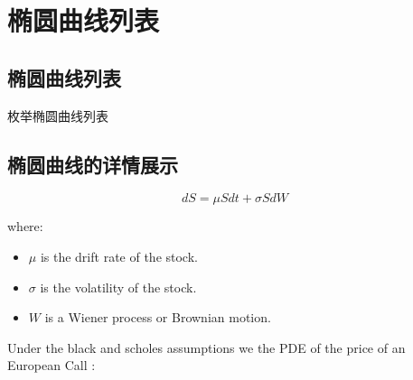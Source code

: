 \documentclass[../Main.tex]{subfiles}
\begin{document}
\chapter{椭圆曲线列表}


\section{椭圆曲线列表}
枚举椭圆曲线列表
\begin{enumerate}

\end{enumerate}

\section{椭圆曲线的详情展示}

\begin{enumerate}

\end{enumerate}

\begin{equation}
    dS = \mu S dt + \sigma S dW
\end{equation}

where:
\begin{itemize}
    \item \( \mu \) is the drift rate of the stock.
    \item \( \sigma \) is the volatility of the stock.
    \item \( W \) is a Wiener process or Brownian motion.
\end{itemize}


Under the black and scholes assumptions we the PDE of the price of an European Call :
\end{document}
